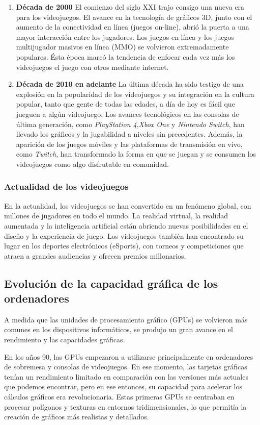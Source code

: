 \begin{enumerate}
    \item \textbf{Década de 2000} El comienzo del siglo XXI trajo consigo una nueva era para los videojuegos. El avance en la tecnología de gráficos 3D, junto con el aumento de la conectividad en línea (juegos on-line), abrió la puerta a una mayor interacción entre los jugadores. Los juegos en línea y los juegos multijugador masivos en línea (MMO) se volvieron extremadamente populares. Ésta época marcó la tendencia de enfocar cada vez más los videojuegos el juego con otros mediante internet. 
    \item \textbf{Década de 2010 en adelante} La última década ha sido testigo de una explosión en la popularidad de los videojuegos y su integración en la cultura popular, tanto que gente de todas las edades, a día de hoy es fácil que jueguen a algún videojuego. Los avances tecnológicos en las consolas de última generación, como \textit{PlayStation 4},\textit{Xbox One} y \textit{Nintendo Switch}, han llevado los gráficos y la jugabilidad a niveles sin precedentes. Además, la aparición de los juegos móviles y las plataformas de transmisión en vivo, como \textit{Twitch}, han transformado la forma en que se juegan y se consumen los videojuegos como algo disfrutable en comunidad.
\end{enumerate}

\subsubsection{Actualidad de los videojuegos}

En la actualidad, los videojuegos se han convertido en un fenómeno global, con millones de jugadores en todo el mundo. La realidad virtual, la realidad aumentada y la inteligencia artificial están abriendo nuevas posibilidades en el diseño y la experiencia de juego. Los videojuegos también han encontrado su lugar en los deportes electrónicos (eSports), con torneos y competiciones que atraen a grandes audiencias y ofrecen premios millonarios.

\subsection{Evolución de la capacidad gráfica de los ordenadores}

A medida que las unidades de procesamiento gráfico (GPUs) se volvieron más comunes en los dispositivos informáticos, se produjo un gran avance en el rendimiento y las capacidades gráficas.

En los años 90, las GPUs empezaron a utilizarse principalmente en ordenadores de sobremesa y consolas de videojuegos. En ese momento, las tarjetas gráficas tenían un rendimiento limitado en comparación con las versiones más actuales que podemos encontrar, pero en ese entonces, su capacidad para acelerar los cálculos gráficos era revolucionaria. Estas primeras GPUs se centraban en procesar polígonos y texturas en entornos tridimensionales, lo que permitía la creación de gráficos más realistas y detallados.

